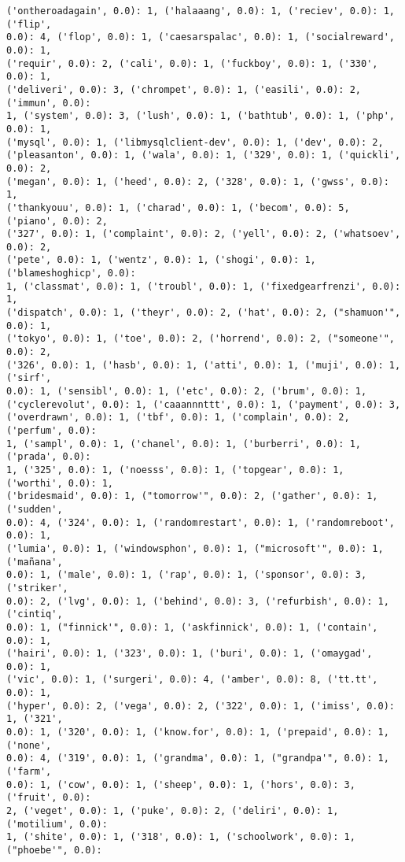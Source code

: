 \documentclass[11pt]{article}
\begin{document}
\begin{Verbatim}[commandchars=\\\{\}]
('ontheroadagain', 0.0): 1, ('halaaang', 0.0): 1, ('reciev', 0.0): 1, ('flip',
0.0): 4, ('flop', 0.0): 1, ('caesarspalac', 0.0): 1, ('socialreward', 0.0): 1,
('requir', 0.0): 2, ('cali', 0.0): 1, ('fuckboy', 0.0): 1, ('330', 0.0): 1,
('deliveri', 0.0): 3, ('chrompet', 0.0): 1, ('easili', 0.0): 2, ('immun', 0.0):
1, ('system', 0.0): 3, ('lush', 0.0): 1, ('bathtub', 0.0): 1, ('php', 0.0): 1,
('mysql', 0.0): 1, ('libmysqlclient-dev', 0.0): 1, ('dev', 0.0): 2,
('pleasanton', 0.0): 1, ('wala', 0.0): 1, ('329', 0.0): 1, ('quickli', 0.0): 2,
('megan', 0.0): 1, ('heed', 0.0): 2, ('328', 0.0): 1, ('gwss', 0.0): 1,
('thankyouu', 0.0): 1, ('charad', 0.0): 1, ('becom', 0.0): 5, ('piano', 0.0): 2,
('327', 0.0): 1, ('complaint', 0.0): 2, ('yell', 0.0): 2, ('whatsoev', 0.0): 2,
('pete', 0.0): 1, ('wentz', 0.0): 1, ('shogi', 0.0): 1, ('blameshoghicp', 0.0):
1, ('classmat', 0.0): 1, ('troubl', 0.0): 1, ('fixedgearfrenzi', 0.0): 1,
('dispatch', 0.0): 1, ('theyr', 0.0): 2, ('hat', 0.0): 2, ("shamuon'", 0.0): 1,
('tokyo', 0.0): 1, ('toe', 0.0): 2, ('horrend', 0.0): 2, ("someone'", 0.0): 2,
('326', 0.0): 1, ('hasb', 0.0): 1, ('atti', 0.0): 1, ('muji', 0.0): 1, ('sirf',
0.0): 1, ('sensibl', 0.0): 1, ('etc', 0.0): 2, ('brum', 0.0): 1,
('cyclerevolut', 0.0): 1, ('caaannnttt', 0.0): 1, ('payment', 0.0): 3,
('overdrawn', 0.0): 1, ('tbf', 0.0): 1, ('complain', 0.0): 2, ('perfum', 0.0):
1, ('sampl', 0.0): 1, ('chanel', 0.0): 1, ('burberri', 0.0): 1, ('prada', 0.0):
1, ('325', 0.0): 1, ('noesss', 0.0): 1, ('topgear', 0.0): 1, ('worthi', 0.0): 1,
('bridesmaid', 0.0): 1, ("tomorrow'", 0.0): 2, ('gather', 0.0): 1, ('sudden',
0.0): 4, ('324', 0.0): 1, ('randomrestart', 0.0): 1, ('randomreboot', 0.0): 1,
('lumia', 0.0): 1, ('windowsphon', 0.0): 1, ("microsoft'", 0.0): 1, ('mañana',
0.0): 1, ('male', 0.0): 1, ('rap', 0.0): 1, ('sponsor', 0.0): 3, ('striker',
0.0): 2, ('lvg', 0.0): 1, ('behind', 0.0): 3, ('refurbish', 0.0): 1, ('cintiq',
0.0): 1, ("finnick'", 0.0): 1, ('askfinnick', 0.0): 1, ('contain', 0.0): 1,
('hairi', 0.0): 1, ('323', 0.0): 1, ('buri', 0.0): 1, ('omaygad', 0.0): 1,
('vic', 0.0): 1, ('surgeri', 0.0): 4, ('amber', 0.0): 8, ('tt.tt', 0.0): 1,
('hyper', 0.0): 2, ('vega', 0.0): 2, ('322', 0.0): 1, ('imiss', 0.0): 1, ('321',
0.0): 1, ('320', 0.0): 1, ('know.for', 0.0): 1, ('prepaid', 0.0): 1, ('none',
0.0): 4, ('319', 0.0): 1, ('grandma', 0.0): 1, ("grandpa'", 0.0): 1, ('farm',
0.0): 1, ('cow', 0.0): 1, ('sheep', 0.0): 1, ('hors', 0.0): 3, ('fruit', 0.0):
2, ('veget', 0.0): 1, ('puke', 0.0): 2, ('deliri', 0.0): 1, ('motilium', 0.0):
1, ('shite', 0.0): 1, ('318', 0.0): 1, ('schoolwork', 0.0): 1, ("phoebe'", 0.0):

\end{Verbatim}
\end{document}
